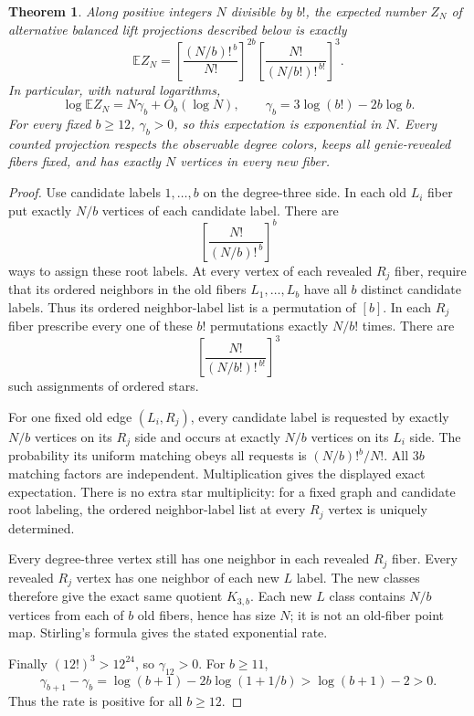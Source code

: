 \documentclass[11pt]{article}
\newtheorem{theorem}{Theorem}
\newcommand{\E}{\mathbb E}
\begin{document}
\begin{theorem}\label{thm:count}
Along positive integers $N$ divisible by $b!$, the expected number $Z_N$
of alternative balanced lift projections described below is exactly
\[
 \E Z_N=
 \left[\frac{(N/b)!^{\,b}}{N!}\right]^{2b}
 \left[\frac{N!}{(N/b!)!^{\,b!}}\right]^3.
\]
In particular, with natural logarithms,
\[
 \log\E Z_N=N\gamma_b+O_b(\log N),\qquad
 \gamma_b=3\log(b!)-2b\log b.
\]
For every fixed $b\ge12$, $\gamma_b>0$, so this expectation is
exponential in $N$. Every counted projection respects the observable
degree colors, keeps all genie-revealed fibers fixed, and has exactly
$N$ vertices in every new fiber.
\end{theorem}
\begin{proof}
Use candidate labels $1,\ldots,b$ on the degree-three side. In each
old $L_i$ fiber put exactly $N/b$ vertices of each candidate label.
There are
\[
 \left[\frac{N!}{(N/b)!^{\,b}}\right]^b
\]
ways to assign these root labels.
At every vertex of each revealed $R_j$ fiber, require that its ordered
neighbors in the old fibers $L_1,\ldots,L_b$ have all $b$ distinct
candidate labels. Thus its ordered neighbor-label list is a permutation
of $[b]$. In each $R_j$ fiber prescribe every one of these $b!$
permutations exactly $N/b!$ times. There are
\[
 \left[\frac{N!}{(N/b!)!^{\,b!}}\right]^3
\]
such assignments of ordered stars.

For one fixed old edge $(L_i,R_j)$, every candidate label is requested
by exactly $N/b$ vertices on its $R_j$ side and occurs at exactly $N/b$
vertices on its $L_i$ side. The probability its uniform matching obeys
all requests is $(N/b)!^b/N!$. All $3b$ matching factors are independent.
Multiplication gives the displayed exact expectation. There is no extra
star multiplicity: for a fixed graph and candidate root labeling, the
ordered neighbor-label list at every $R_j$ vertex is uniquely determined.

Every degree-three vertex still has one neighbor in each revealed
$R_j$ fiber. Every revealed $R_j$ vertex has one neighbor of each new
$L$ label. The new classes therefore give the exact same quotient
$K_{3,b}$. Each new $L$ class contains $N/b$ vertices from each of $b$
old fibers, hence has size $N$; it is not an old-fiber point map.
Stirling's formula gives the stated exponential rate.

Finally $(12!)^3>12^{24}$, so $\gamma_{12}>0$. For $b\ge11$,
\[
 \gamma_{b+1}-\gamma_b
 =\log(b+1)-2b\log(1+1/b)
 >\log(b+1)-2>0.
\]
Thus the rate is positive for all $b\ge12$.
\end{proof}
\end{document}
